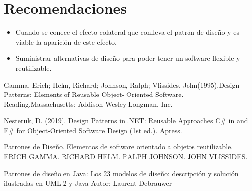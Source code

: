 \documentclass[twoside,twocolumn]{article}
\begin{document}
\section{Recomendaciones}


\begin{itemize}
\item Cuando se conoce el efecto colateral que conlleva el patrón de diseño y es viable la aparición de este efecto.
\item Suministrar alternativas de diseño para poder tener un software flexible y reutilizable.

\end{itemize}




\begin{thebibliography}{99} 

\bibitem[1]{}
\newblock Gamma, Erich; Helm, Richard; Johnson, Ralph; Vlissides, John(1995).Design Patterns: Elements of Reusable Object- Oriented Software. Reading,Massachusetts: Addison Wesley Longman, Inc.

\bibitem[2]{}
\newblock Nesteruk, D. (2019). Design Patterns in .NET: Reusable Approaches C\# in and F\# for Object-Oriented Software Design (1st ed.). Apress.

\bibitem[3]{}
\newblock Patrones de Diseño. Elementos de software orientado a objetos reutilizable. ERICH GAMMA. RICHARD HELM. RALPH JOHNSON. JOHN VLISSIDES.

\bibitem[4]{}
\newblock Patrones de diseño en Java: Los 23 modelos de diseño: descripción y solución ilustradas en UML 2 y Java Autor: Laurent Debrauwer

\end{thebibliography}


\end{document}
